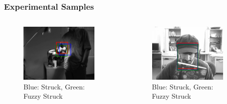 \begin{frame}
    \frametitle{Experimental Samples}
    \begin{columns}[T]
        \begin{column}{0.5\textwidth}
            \begin{figure}
                \includegraphics[width=0.9\textwidth]{sylv.png}
                \caption{Blue: Struck, Green: Fuzzy Struck}
            \end{figure}
        \end{column}
        \begin{column}{0.5\textwidth}
            \begin{figure}
                \includegraphics[width=0.9\textwidth]{faceocc2.png}
                \caption{Blue: Struck, Green: Fuzzy Struck}
            \end{figure}
        \end{column}
    \end{columns}
\end{frame}


